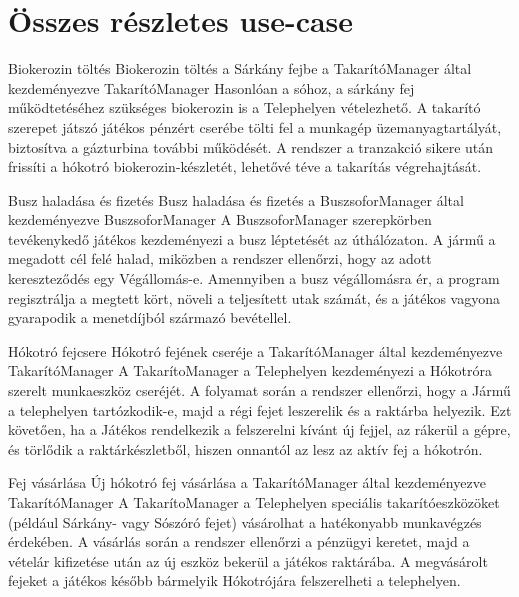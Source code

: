 \section{Összes részletes use-case}

\begin{use-case}
    {Biokerozin töltés}
    {Biokerozin töltés a Sárkány fejbe a TakarítóManager által kezdeményezve}
    {TakarítóManager}
    Hasonlóan a sóhoz, a sárkány fej működtetéséhez szükséges biokerozin is a Telephelyen vételezhető. A takarító szerepet játszó játékos pénzért cserébe tölti fel a munkagép üzemanyagtartályát, biztosítva a gázturbina további működését. A rendszer a tranzakció sikere után frissíti a hókotró biokerozin-készletét, lehetővé téve a takarítás végrehajtását.
\end{use-case}

\begin{use-case}
    {Busz haladása és fizetés}
    {Busz haladása és fizetés a BuszsoforManager által kezdeményezve}
    {BuszsoforManager}
    A BuszsoforManager szerepkörben tevékenykedő játékos kezdeményezi a busz léptetését az úthálózaton. A jármű a megadott cél felé halad, miközben a rendszer ellenőrzi, hogy az adott kereszteződés egy Végállomás-e. Amennyiben a busz végállomásra ér, a program regisztrálja a megtett kört, növeli a teljesített utak számát, és a játékos vagyona gyarapodik a menetdíjból származó bevétellel.
\end{use-case}

\begin{use-case}
    {Hókotró fejcsere}
    {Hókotró fejének cseréje a TakarítóManager által kezdeményezve}
    {TakarítóManager}
    A TakarítoManager a Telephelyen kezdeményezi a Hókotróra szerelt munkaeszköz cseréjét. A folyamat során a rendszer ellenőrzi, hogy a Jármű a telephelyen tartózkodik-e, majd a régi fejet leszerelik és a raktárba helyezik. Ezt követően, ha a Játékos rendelkezik a felszerelni kívánt új fejjel, az rákerül a gépre, és törlődik a raktárkészletből, hiszen onnantól az lesz az aktív fej a hókotrón.
\end{use-case}

\begin{use-case}
    {Fej vásárlása}
    {Új hókotró fej vásárlása a TakarítóManager által kezdeményezve}
    {TakarítóManager}
    A TakarítoManager a Telephelyen speciális takarítóeszközöket (például Sárkány- vagy Sószóró fejet) vásárolhat a hatékonyabb munkavégzés érdekében. A vásárlás során a rendszer ellenőrzi a pénzügyi keretet, majd a vételár kifizetése után az új eszköz bekerül a játékos raktárába. A megvásárolt fejeket a játékos később bármelyik Hókotrójára felszerelheti a telephelyen.
\end{use-case}

